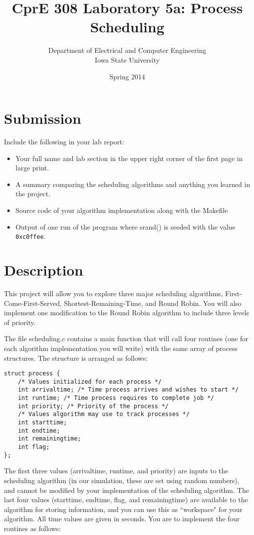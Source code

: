 \documentclass[letterpaper,10pt]{article}
\title{CprE 308 Laboratory 5a: Process Scheduling}
\author{Department of Electrical and Computer Engineering \\ Iowa State University}
\date{Spring 2014}
\begin{document}
\maketitle
\section{Submission}
Include the following in your lab report:
\begin{itemize}
 \item Your full name and lab section in the upper right corner of the first page in large print.
 \item A summary comparing the scheduling algorithms and anything you learned in the project.
 \item Source code of your algorithm implementation along with the Makefile
 \item Output of one run of the program where srand() is seeded with the value \verb=0xc0ffee=.
\end{itemize}


\section{Description}
This project will allow you to explore three major scheduling
algorithms, First-Come-First-Served, Shortest-Remaining-Time, and Round Robin. You
will also implement one modification to the Round Robin algorithm to include three levels
of priority.

The file scheduling.c contains a main function that will call four routines (one for each
algorithm implementation you will write) with the same array of process structures. The
structure is arranged as follows:


\begin{verbatim}
struct process {
    /* Values initialized for each process */
    int arrivaltime; /* Time process arrives and wishes to start */
    int runtime; /* Time process requires to complete job */
    int priority; /* Priority of the process */
    /* Values algorithm may use to track processes */
    int starttime;
    int endtime;
    int remainingtime;
    int flag;
};
\end{verbatim}
The first three values (arrivaltime, runtime, and priority) are inputs to the scheduling algorithm
(in our simulation, these are set using random numbers), and cannot be modified by your
implementation of the scheduling algorithm. The last four values (starttime, endtime, flag, and
remainingtime) are available to the algorithm for storing information, and you can use this as
``workspace" for your algorithm. All time values are given in seconds. You are to implement the
four routines as follows:
\end{document}
